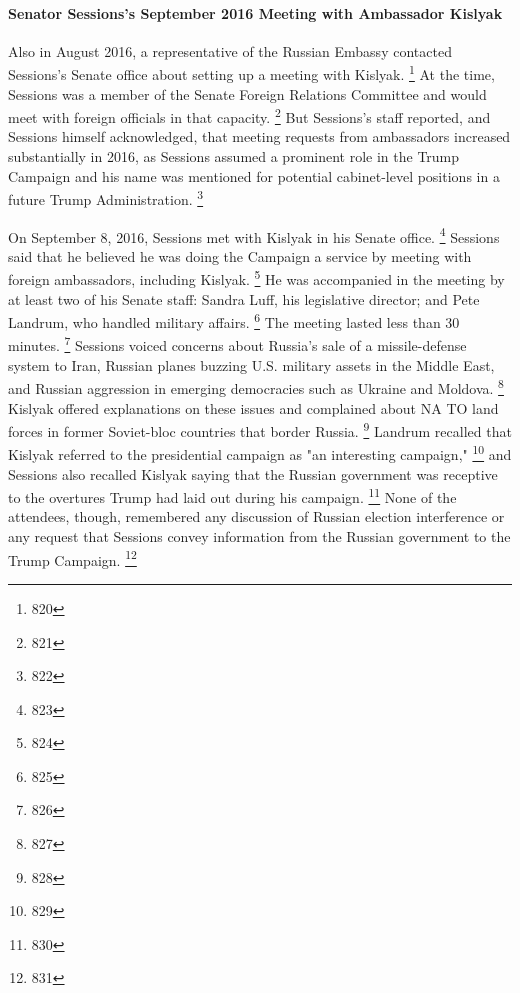 \paragraph{Senator Sessions's September 2016 Meeting with Ambassador Kislyak}

Also in August 2016, a representative of the Russian Embassy contacted Sessions's Senate office about setting up a meeting with Kislyak.%
\footnote{820}
At the time, Sessions was a member of the Senate Foreign Relations Committee and would meet with foreign officials in that capacity.%
\footnote{821}
But Sessions's staff reported, and Sessions himself acknowledged, that meeting requests from ambassadors increased substantially in 2016, as Sessions assumed a prominent role in the Trump Campaign and his name was mentioned for potential cabinet-level positions in a future Trump Administration.%
\footnote{822}

On September 8, 2016, Sessions met with Kislyak in his Senate office.%
\footnote{823}
Sessions said that he believed he was doing the Campaign a service by meeting with foreign ambassadors, including Kislyak.%
\footnote{824}
He was accompanied in the meeting by at least two of his Senate staff: Sandra Luff, his legislative director; and Pete Landrum, who handled military affairs.%
\footnote{825}
The meeting lasted less than 30 minutes.%
\footnote{826}
Sessions voiced concerns about Russia's sale of a missile-defense system to Iran, Russian planes buzzing U.S. military assets in the Middle East, and Russian aggression in emerging democracies such as Ukraine and Moldova.%
\footnote{827}
Kislyak offered explanations on these issues and complained about NA TO land forces in former Soviet-bloc countries that border Russia.%
\footnote{828}
Landrum recalled that Kislyak referred to the presidential campaign as "an interesting campaign,"%
\footnote{829}
and Sessions also recalled Kislyak saying that the Russian government was receptive to the overtures Trump had laid out during his campaign.%
\footnote{830}
None of the attendees, though, remembered any discussion of Russian election interference or any request that Sessions convey information from the Russian government to the Trump Campaign.%
\footnote{831}

